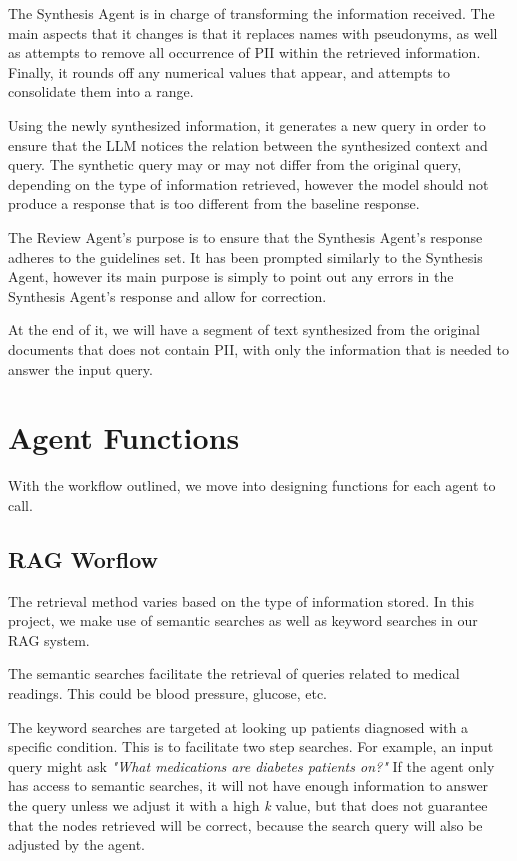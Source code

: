 The Synthesis Agent is in charge of transforming the information received. The main aspects that it changes is that it replaces names with pseudonyms, as well as attempts to remove all occurrence of PII within the retrieved information. Finally, it rounds off any numerical values that appear, and attempts to consolidate them into a range.

Using the newly synthesized information, it generates a new query in order to ensure that the LLM notices the relation between the synthesized context and query. The synthetic query may or may not differ from the original query, depending on the type of information retrieved, however the model should not produce a response that is too different from the baseline response.

The Review Agent's purpose is to ensure that the Synthesis Agent's response adheres to the guidelines set. It has been prompted similarly to the Synthesis Agent, however its main purpose is simply to point out any errors in the Synthesis Agent's response and allow for correction.

At the end of it, we will have a segment of text synthesized from the original documents that does not contain PII, with only the information that is needed to answer the input query.
\section{Agent Functions}

With the workflow outlined, we move into designing functions for each agent to call.

\subsection{RAG Worflow}


The retrieval method varies based on the type of information stored. In this project, we make use of semantic searches as well as keyword searches in our RAG system.

The semantic searches facilitate the retrieval of queries related to medical readings. This could be blood pressure, glucose, etc.

The keyword searches are targeted at looking up patients diagnosed with a specific condition. This is to facilitate two step searches. For example, an input query might ask \textit{"What medications are diabetes patients on?"}
If the agent only has access to semantic searches, it will not have enough information to answer the query unless we adjust it with a high \textit{k} value, but that does not guarantee that the nodes retrieved will be correct, because the search query will also be adjusted by the agent.

